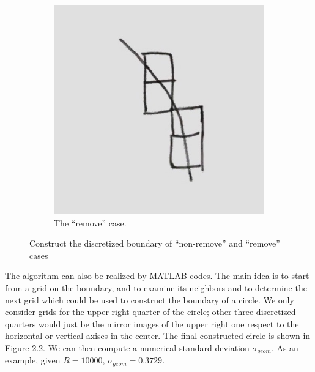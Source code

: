 \documentclass[letterpaper]{article}
\numberwithin{equation}{section} %
\numberwithin{figure}{section} %
\numberwithin{table}{section} %
\begin{document}
\begin{figure}[htbp]
\begin{subfigure}[b]{0.2\textwidth}
		\includegraphics[width=\textwidth]{RmvSetup}
		\caption{The \enquote{remove} case.}
		\label{RmvSetup}
	\end{subfigure}

	\caption{Construct the discretized boundary of \enquote{non-remove} and \enquote{remove} cases}
	\label{Construct the discretized boundary of "non-remove" and "remove" cases}
\end{figure}

The algorithm can also be realized by MATLAB codes. The main idea is to start from a grid on the boundary, and to examine its neighbors and to determine the next grid which could be used to construct the boundary of a circle. We only consider grids for the upper right quarter of the circle; other three discretized quarters would just be the mirror images of the upper right one respect to the horizontal or vertical axises in the center. The final constructed circle is shown in Figure 2.2. We can then compute a numerical standard deviation $\sigma_{geom}$. As an example, given $R=10000$, $\sigma_{geom}=0.3729$.
\end{document}
